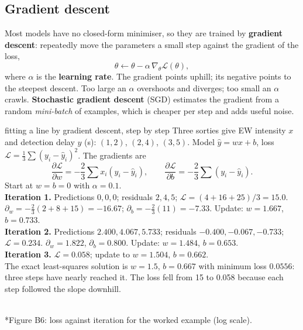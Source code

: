 \documentclass[11pt]{article}
\begin{document}
\subsection{Gradient descent}
Most models have no closed-form minimiser, so they are trained by \textbf{gradient descent}: repeatedly move the parameters a small step against the gradient of the loss,
\[\theta\leftarrow\theta-\alpha\,\nabla_\theta\mathcal L(\theta),\]
where $\alpha$ is the \textbf{learning rate}. The gradient points uphill; its negative points to the steepest descent. Too large an $\alpha$ overshoots and diverges; too small an $\alpha$ crawls. \textbf{Stochastic gradient descent} (SGD) estimates the gradient from a random \emph{mini-batch} of examples, which is cheaper per step and adds useful noise.
\begin{example}{fitting a line by gradient descent, step by step}
Three sorties give EW intensity $x$ and detection delay $y$ (s): $(1,2)$, $(2,4)$, $(3,5)$. Model $\hat y=wx+b$, loss $\mathcal L=\frac13\sum(y_i-\hat y_i)^2$. The gradients are
\[\frac{\partial\mathcal L}{\partial w}=-\frac23\sum x_i(y_i-\hat y_i),\qquad\frac{\partial\mathcal L}{\partial b}=-\frac23\sum(y_i-\hat y_i).\]
Start at $w=b=0$ with $\alpha=0.1$.\\[3pt]
\textbf{Iteration 1.} Predictions $0,0,0$; residuals $2,4,5$; $\mathcal L=(4+16+25)/3=15.0$. $\partial_w=-\frac23(2+8+15)=-16.67$; $\partial_b=-\frac23(11)=-7.33$. Update: $w=1.667$, $b=0.733$.\\
\textbf{Iteration 2.} Predictions $2.400,4.067,5.733$; residuals $-0.400,-0.067,-0.733$; $\mathcal L=0.234$. $\partial_w=1.822$, $\partial_b=0.800$. Update: $w=1.484$, $b=0.653$.\\
\textbf{Iteration 3.} $\mathcal L=0.058$; update to $w=1.504$, $b=0.662$.\\[3pt]
The exact least-squares solution is $w=1.5$, $b=0.667$ with minimum loss $0.0556$: three steps have nearly reached it. The loss fell from 15 to 0.058 because each step followed the slope downhill.
\end{example}
\begin{center}\\*{\small\color{GreyN}Figure B6: loss against iteration for the worked example (log scale).}\end{center}
\end{document}
